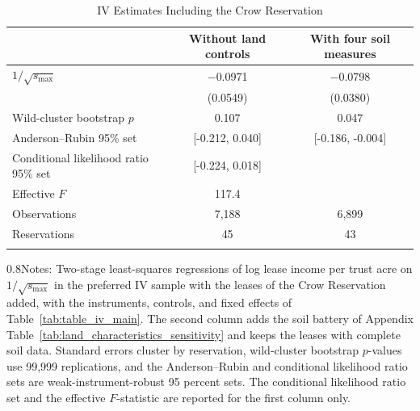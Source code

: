 \begin{table}[H]
\caption{IV Estimates Including the Crow Reservation}
\label{tab:crow_included}
\setlength\extrarowheight{-6pt}
\vspace{.75ex}
\begin{tabular*}{\textwidth}{@{\hskip\tabcolsep\extracolsep\fill}lcc}
\toprule
 & Without land controls & With four soil measures \\
\midrule
$1/\sqrt{s_{\max}}$ & $-$0.0971 & $-$0.0798 \\
 & (0.0549) & (0.0380) \\[0.3ex]
Wild-cluster bootstrap $p$ & 0.107 & 0.047 \\
Anderson--Rubin 95\% set & [-0.212, 0.040] & [-0.186, -0.004] \\
Conditional likelihood ratio 95\% set & [-0.224, 0.018] & \\
Effective $F$ & 117.4 & \\
\midrule
Observations & 7,188 & 6,899 \\
Reservations & 45 & 43 \\
\bottomrule
\addlinespace[.75ex]
\end{tabular*}
\parbox{1\textwidth}{\begin{spacing}{0.8}\small\noindent Notes: Two-stage least-squares regressions of log lease income per trust acre on $1/\sqrt{s_{\max}}$ in the preferred IV sample with the leases of the Crow Reservation added, with the instruments, controls, and fixed effects of Table~\ref{tab:table_iv_main}. The second column adds the soil battery of Appendix Table~\ref{tab:land_characteristics_sensitivity} and keeps the leases with complete soil data. Standard errors cluster by reservation, wild-cluster bootstrap $p$-values use 99,999 replications, and the Anderson--Rubin and conditional likelihood ratio sets are weak-instrument-robust 95 percent sets. The conditional likelihood ratio set and the effective $F$-statistic are reported for the first column only.\end{spacing}}
\end{table}
